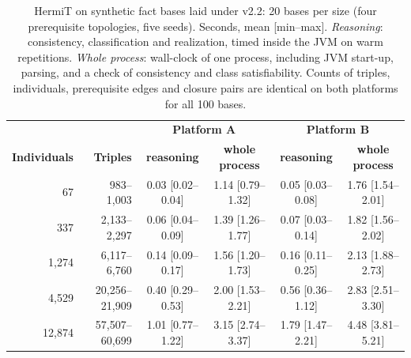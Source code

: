 \begin{table}[!t]
\caption{HermiT on synthetic fact bases laid under v2.2: 20 bases per size (four prerequisite topologies, five seeds). Seconds, mean [min--max]. \emph{Reasoning}: consistency, classification and realization, timed inside the JVM on warm repetitions. \emph{Whole process}: wall-clock of one process, including JVM start-up, parsing, and a check of consistency and class satisfiability. Counts of triples, individuals, prerequisite edges and closure pairs are identical on both platforms for all 100 bases.}
\label{tab:scal}
\centering
\footnotesize
\begin{tabular}{rrcccc}
\hline
& & \multicolumn{2}{c}{\textbf{Platform A}} & \multicolumn{2}{c}{\textbf{Platform B}} \\
\textbf{Individuals} & \textbf{Triples} & \textbf{reasoning} & \textbf{whole process} & \textbf{reasoning} & \textbf{whole process} \\
\hline
67 & 983--1{,}003 & 0.03 [0.02--0.04] & 1.14 [0.79--1.32] & 0.05 [0.03--0.08] & 1.76 [1.54--2.01] \\
337 & 2{,}133--2{,}297 & 0.06 [0.04--0.09] & 1.39 [1.26--1.77] & 0.07 [0.03--0.14] & 1.82 [1.56--2.02] \\
1{,}274 & 6{,}117--6{,}760 & 0.14 [0.09--0.17] & 1.56 [1.20--1.73] & 0.16 [0.11--0.25] & 2.13 [1.88--2.73] \\
4{,}529 & 20{,}256--21{,}909 & 0.40 [0.29--0.53] & 2.00 [1.53--2.21] & 0.56 [0.36--1.12] & 2.83 [2.51--3.30] \\
12{,}874 & 57{,}507--60{,}699 & 1.01 [0.77--1.22] & 3.15 [2.74--3.37] & 1.79 [1.47--2.21] & 4.48 [3.81--5.21] \\
\hline
\end{tabular}
\end{table}
